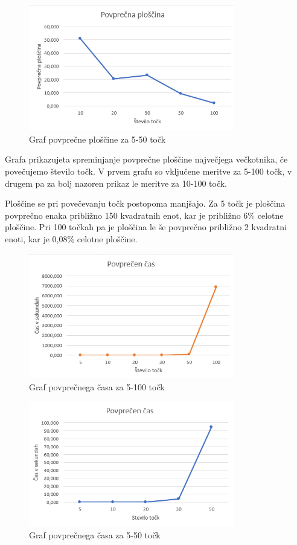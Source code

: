\documentclass[a4, 12pt]{article}
\begin{document}
\begin{figure}[H]
  \centering
  \newpage
  \includegraphics[width= 0.8\textwidth]{ploscina1}
  \caption{Graf povprečne ploščine za 5-50 točk}
\end{figure}

Grafa prikazujeta spreminjanje povprečne ploščine največjega večkotnika, če povečujemo število točk. V prvem grafu so vključene meritve za 5-100 točk, v drugem pa za bolj nazoren prikaz le meritve za 10-100 točk.

Ploščine se pri povečevanju točk postopoma manjšajo. Za 5 točk je ploščina povprečno enaka približno 150 kvadratnih enot, kar je približno 6\% celotne ploščine. Pri 100 točkah pa je ploščina le še povprečno približno 2 kvadratni enoti, kar je 0,08\% celotne ploščine.

\begin{figure}[H]
  \centering
  \includegraphics[width= 0.8\textwidth]{cas2}
  \caption{Graf povprečnega časa za 5-100 točk}
\end{figure}

\begin{figure}[H]
  \centering
  \includegraphics[width= 0.8\textwidth]{cas1}
  \caption{Graf povprečnega časa za 5-50 točk}
\end{figure}
\end{document}
